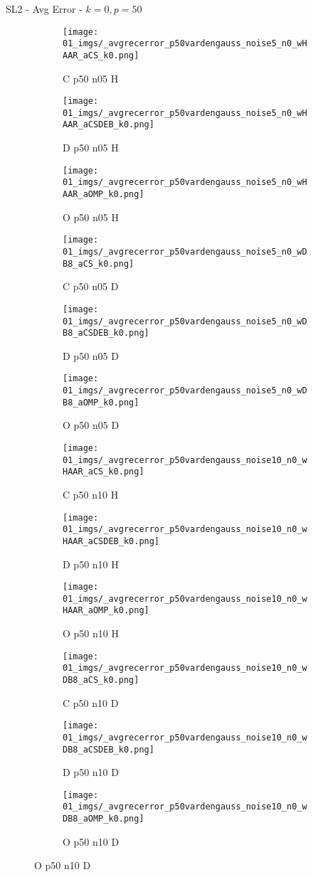 \begin{frame}{SL2 - Avg Error - $k=0,p=50$}{}
\begin{figure}
\begin{subfigure}{0.13\textwidth}
\texttt{[image: 01\_imgs/\_avgrecerror\_p50vardengauss\_noise5\_n0\_wHAAR\_aCS\_k0.png]}
\caption*{\tiny C p50 n05 H}
\end{subfigure}
\begin{subfigure}{0.13\textwidth}
\texttt{[image: 01\_imgs/\_avgrecerror\_p50vardengauss\_noise5\_n0\_wHAAR\_aCSDEB\_k0.png]}
\caption*{\tiny D p50 n05 H}
\end{subfigure}
\begin{subfigure}{0.13\textwidth}
\texttt{[image: 01\_imgs/\_avgrecerror\_p50vardengauss\_noise5\_n0\_wHAAR\_aOMP\_k0.png]}
\caption*{\tiny O p50 n05 H}
\end{subfigure}
\begin{subfigure}{0.13\textwidth}
\texttt{[image: 01\_imgs/\_avgrecerror\_p50vardengauss\_noise5\_n0\_wDB8\_aCS\_k0.png]}
\caption*{\tiny C p50 n05 D}
\end{subfigure}
\begin{subfigure}{0.13\textwidth}
\texttt{[image: 01\_imgs/\_avgrecerror\_p50vardengauss\_noise5\_n0\_wDB8\_aCSDEB\_k0.png]}
\caption*{\tiny D p50 n05 D}
\end{subfigure}
\begin{subfigure}{0.13\textwidth}
\texttt{[image: 01\_imgs/\_avgrecerror\_p50vardengauss\_noise5\_n0\_wDB8\_aOMP\_k0.png]}
\caption*{\tiny O p50 n05 D}
\end{subfigure}

\vspace{5pt}

\begin{subfigure}{0.13\textwidth}
\texttt{[image: 01\_imgs/\_avgrecerror\_p50vardengauss\_noise10\_n0\_wHAAR\_aCS\_k0.png]}
\caption*{\tiny C p50 n10 H}
\end{subfigure}
\begin{subfigure}{0.13\textwidth}
\texttt{[image: 01\_imgs/\_avgrecerror\_p50vardengauss\_noise10\_n0\_wHAAR\_aCSDEB\_k0.png]}
\caption*{\tiny D p50 n10 H}
\end{subfigure}
\begin{subfigure}{0.13\textwidth}
\texttt{[image: 01\_imgs/\_avgrecerror\_p50vardengauss\_noise10\_n0\_wHAAR\_aOMP\_k0.png]}
\caption*{\tiny O p50 n10 H}
\end{subfigure}
\begin{subfigure}{0.13\textwidth}
\texttt{[image: 01\_imgs/\_avgrecerror\_p50vardengauss\_noise10\_n0\_wDB8\_aCS\_k0.png]}
\caption*{\tiny C p50 n10 D}
\end{subfigure}
\begin{subfigure}{0.13\textwidth}
\texttt{[image: 01\_imgs/\_avgrecerror\_p50vardengauss\_noise10\_n0\_wDB8\_aCSDEB\_k0.png]}
\caption*{\tiny D p50 n10 D}
\end{subfigure}
\begin{subfigure}{0.13\textwidth}
\texttt{[image: 01\_imgs/\_avgrecerror\_p50vardengauss\_noise10\_n0\_wDB8\_aOMP\_k0.png]}
\caption*{\tiny O p50 n10 D}
\end{subfigure}


\end{figure}
\end{frame}
